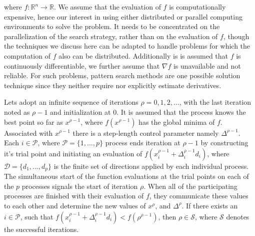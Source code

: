 		where $f:\mathbb{R}^n\longrightarrow\mathbb{R}$. We assume that the evaluation of $f$ is computationally expensive, hence our interest in using either distributed or parallel computing environments to solve the problem. It needs to be concentrated on the parallelization of the search strategy, rather than on the evaluation of $f$, though the techniques we discuss here can be adapted to handle problems for which the computation of $f$ also can be distributed. Additionally is is assumed that $f$ is continuously differentiable, we further assume that $\nabla f$ is unavailable
and not reliable. For such problems, pattern search methods are one possible solution technique since they neither require nor explicitly estimate derivatives.\\


Lets adopt an infinite sequence of iterations $\rho=0,1,2,\dots$, with the last iteration noted as $\rho-1$ and initialization at $0$. It is assumed that the process knows the best point so far as $x^{\rho-1}$, where $f(x^{\rho-1})$ has the global minima of $f$. Associated with $x^{\rho-1}$ there is a step-length control parameter namely $\Delta^{\rho-1}$. Each $i\in\mathcal{P}$, where $\mathcal{P}=\{1,\dots,p\}$ process ends iteration at $\rho-1$ by constructing it's trial point and initiating an evaluation of $f(x^{\rho-1}_i+\Delta^{\rho-1}_id_i)$, where $\mathcal{D}=\{d_1,\dots,d_p\}$ is the finite set of directions applied by each individual process. The simultaneous start of the function evaluations at the trial points on each of the $p$ processes signals the start of iteration $\rho$. When all of the participating processes are finished with their evaluation of $f$, they communicate these values to each other and determine the new values of $x^\rho$, and $\Delta^\rho$. If there exists an $i\in\mathcal{P}$, such that $f(x^{\rho-1}_i+\Delta^{\rho-1}_id_i)<f(\rho^{\rho-1})$, then $\rho\in\mathcal{S}$, where $\mathcal{S}$ denotes the successful iterations.


